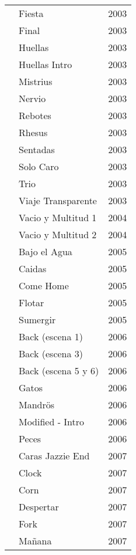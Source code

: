 \begin{center}
\begin{longtable}{ p{}  p{}  p{} }
& Fiesta & 2003 \\ \cmidrule (r){2-3} 
& Final & 2003 \\ \cmidrule (r){2-3} 
& Huellas & 2003 \\ \cmidrule (r){2-3} 
& Huellas Intro & 2003 \\ \cmidrule (r){2-3} 
& Mistrius & 2003 \\ \cmidrule (r){2-3} 
& Nervio & 2003 \\ \cmidrule (r){2-3} 
& Rebotes & 2003 \\ \cmidrule (r){2-3} 
& Rhesus & 2003 \\ \cmidrule (r){2-3} 
& Sentadas & 2003 \\ \cmidrule (r){2-3} 
& Solo Caro & 2003 \\ \cmidrule (r){2-3} 
& Trio & 2003 \\ \cmidrule (r){2-3} 
& Viaje Transparente & 2003 \\ \cmidrule (r){2-3} 
& Vacio y Multitud 1 & 2004 \\ \cmidrule (r){2-3} 
& Vacio y Multitud 2 & 2004 \\ \cmidrule (r){2-3} 
& Bajo el Agua & 2005 \\ \cmidrule (r){2-3} 
& Caidas & 2005 \\ \cmidrule (r){2-3} 
& Come Home & 2005 \\ \cmidrule (r){2-3} 
& Flotar & 2005 \\ \cmidrule (r){2-3} 
& Sumergir & 2005 \\ \cmidrule (r){2-3} 
& Back (escena 1) & 2006 \\ \cmidrule (r){2-3} 
& Back (escena 3) & 2006 \\ \cmidrule (r){2-3} 
& Back (escena 5 y 6) & 2006 \\ \cmidrule (r){2-3} 
& Gatos & 2006 \\ \cmidrule (r){2-3} 
& Mandrös & 2006 \\ \cmidrule (r){2-3} 
& Modified - Intro & 2006 \\ \cmidrule (r){2-3} 
& Peces & 2006 \\ \cmidrule (r){2-3} 
& Caras Jazzie End & 2007 \\ \cmidrule (r){2-3} 
& Clock & 2007 \\ \cmidrule (r){2-3} 
& Corn & 2007 \\ \cmidrule (r){2-3} 
& Despertar & 2007 \\ \cmidrule (r){2-3} 
& Fork & 2007 \\ \cmidrule (r){2-3} 
& Mañana & 2007 \\ \cmidrule (r){2-3} 

\end{longtable}
\end{center}
